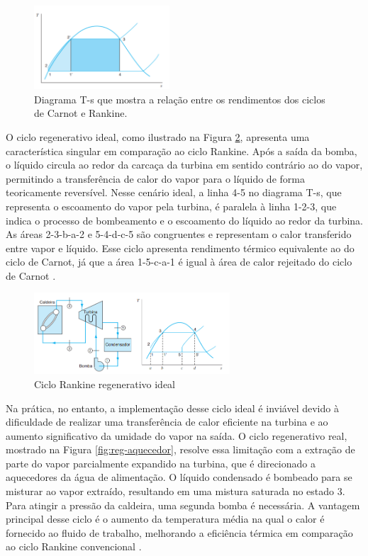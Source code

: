 \documentclass[
	article,			%
	11pt,				%
	oneside,			%
	a4paper,			%
	english,			%
	brazil,				%
	sumario=tradicional
	]{abntex2}
\begin{document}
\begin{figure}[h]
	\centering
	\includegraphics[width=0.45\textwidth]{./images/regeneracao.png}
	\caption{Diagrama T-s que mostra a relação entre os rendimentos dos ciclos de Carnot e Rankine.}
	\label{fig:regerenacao}
\end{figure}

O ciclo regenerativo ideal, como ilustrado na Figura \ref{fig:regenerativo}, apresenta uma característica singular em comparação ao ciclo Rankine. Após a saída da bomba, o líquido circula ao redor da carcaça da turbina em sentido contrário ao do vapor, permitindo a transferência de calor do vapor para o líquido de forma teoricamente reversível. Nesse cenário ideal, a linha 4-5 no diagrama T-s, que representa o escoamento do vapor pela turbina, é paralela à linha 1-2-3, que indica o processo de bombeamento e o escoamento do líquido ao redor da turbina. As áreas 2-3-b-a-2 e 5-4-d-c-5 são congruentes e representam o calor transferido entre vapor e líquido. Esse ciclo apresenta rendimento térmico equivalente ao do ciclo de Carnot, já que a área 1-5-c-a-1 é igual à área de calor rejeitado do ciclo de Carnot \cite{borgnakke-2020}.

\begin{figure}[h]
	\centering
	\includegraphics[width=0.65\textwidth]{./images/regenerativo.png}
	\caption{Ciclo Rankine regenerativo ideal}
	\label{fig:regenerativo}
\end{figure}

Na prática, no entanto, a implementação desse ciclo ideal é inviável devido à dificuldade de realizar uma transferência de calor eficiente na turbina e ao aumento significativo da umidade do vapor na saída. O ciclo regenerativo real, mostrado na Figura \ref{fig:reg-aquecedor}, resolve essa limitação com a extração de parte do vapor parcialmente expandido na turbina, que é direcionado a aquecedores da água de alimentação. O líquido condensado é bombeado para se misturar ao vapor extraído, resultando em uma mistura saturada no estado 3. Para atingir a pressão da caldeira, uma segunda bomba é necessária. A vantagem principal desse ciclo é o aumento da temperatura média na qual o calor é fornecido ao fluido de trabalho, melhorando a eficiência térmica em comparação ao ciclo Rankine convencional \cite{borgnakke-2020}.
\end{document}
